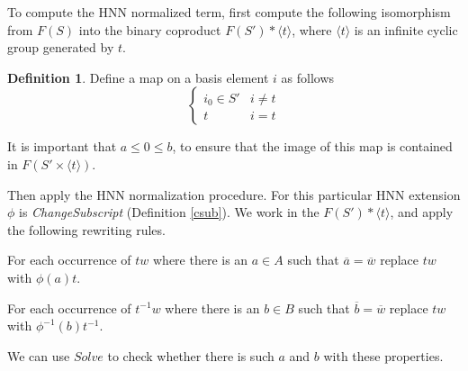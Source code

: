 \documentclass[11pt]{article} %
\theoremstyle{definition}
\theoremstyle{definition}
\theoremstyle{definition}
\theoremstyle{definition}
\theoremstyle{definition}
\newtheorem{defn}[theorem]{Definition}
\theoremstyle{definition}
\begin{document}
To compute the HNN normalized term,
first compute the following isomorphism from $F(S)$ into the binary
coproduct $F(S') \ast \langle t \rangle$, where $\langle t \rangle$ is an infinite
cyclic group generated by $t$.

\begin{defn}\label{tocoprod}
  Define a map on a basis element $i$ as follows
  \begin{equation}
    \begin{cases}
      i_0 \in S' & i \ne t \\
      t & i = t
    \end{cases}
  \end{equation}
\end{defn}

It is important that $a \le 0 \le b$, to ensure that the image
of this map is contained in $F(S' \times \langle t \rangle)$.

Then apply the HNN normalization procedure. For this particular HNN extension
$\phi$ is \textit{ChangeSubscript} (Definition \ref{csub}).
We work in the $F(S') \ast \langle t \rangle$, and apply the following rewriting rules.

For each occurrence of $tw$ where there is an $a \in A$ such that
$\overline{a} = \overline{w}$ replace $tw$ with $\phi(a)t$.

For each occurrence of $t^{-1}w$ where there is an $b \in B$ such that
$\overline{b} = \overline{w}$ replace $tw$ with $\phi^{-1}(b)t^{-1}$.

We can use $\textit{Solve}$ to check whether there is such $a$ and $b$ with
these properties.




\end{document}
